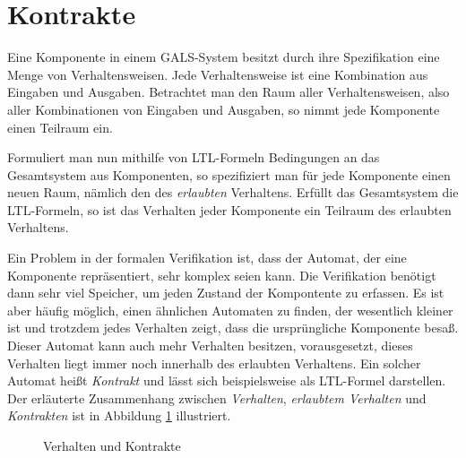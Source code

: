 \section{Kontrakte}
Eine Komponente in einem GALS-System besitzt durch ihre Spezifikation eine Menge von Verhaltensweisen.
Jede Verhaltensweise ist eine Kombination aus Eingaben und Ausgaben.
Betrachtet man den Raum aller Verhaltensweisen, also aller Kombinationen von Eingaben und Ausgaben, so nimmt jede Komponente einen Teilraum ein.

Formuliert man nun mithilfe von LTL-Formeln Bedingungen an das Gesamtsystem aus Komponenten, so spezifiziert man für jede Komponente einen neuen Raum, nämlich den des \emph{erlaubten} Verhaltens.
Erfüllt das Gesamtsystem die LTL-Formeln, so ist das Verhalten jeder Komponente ein Teilraum des erlaubten Verhaltens.

Ein Problem in der formalen Verifikation ist, dass der Automat, der eine Komponente repräsentiert, sehr komplex seien kann.
Die Verifikation benötigt dann sehr viel Speicher, um jeden Zustand der Kompontente zu erfassen.
Es ist aber häufig möglich, einen ähnlichen Automaten zu finden, der wesentlich kleiner ist und trotzdem jedes Verhalten zeigt, dass die ursprüngliche Komponente besaß.
Dieser Automat kann auch mehr Verhalten besitzen, vorausgesetzt, dieses Verhalten liegt immer noch innerhalb des erlaubten Verhaltens.
Ein solcher Automat heißt \emph{Kontrakt} und lässt sich beispielsweise als LTL-Formel darstellen.
Der erläuterte Zusammenhang zwischen \emph{Verhalten}, \emph{erlaubtem Verhalten} und \emph{Kontrakten} ist in Abbildung \ref{fig:contracts} illustriert.
\begin{figure}[h]
  \centering
  \caption{Verhalten und Kontrakte}
  \label{fig:contracts}
\end{figure}

